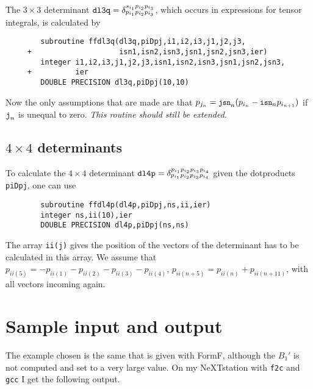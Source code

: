 The $3\times3$ determinant $\mbox{\tt dl3q} = \delta^{s_{i_1} p_{i_2} p_{i_3}
}_{p_{i_1}p_{i_2}p_{i_3}}$, which occurs in expressions for tensor integrals,
is calculated by
\begin{verbatim}
        subroutine ffdl3q(dl3q,piDpj,i1,i2,i3,j1,j2,j3,
     +                    isn1,isn2,isn3,jsn1,jsn2,jsn3,ier)
        integer i1,i2,i3,j1,j2,j3,isn1,isn2,isn3,jsn1,jsn2,jsn3,
     +          ier
        DOUBLE PRECISION dl3q,piDpj(10,10)
\end{verbatim}
Now the only assumptions that are made are that $p_{j_n} = \mbox{\small\tt 
jsn}_n (p_{i_n} - \mbox{\small\tt isn}_n p_{i_{n+1}})$ if $\mbox{\tt j}_n$ is 
unequal to zero.  {\em This routine should still be extended}.

\subsection{$4\times4$ determinants}

To calculate the $4\times4$ determinant $\mbox{\tt dl4p} = 
\delta^{p_{i_1}p_{i_2}p_{i_3}p_{i_4}}_{p_{i_1}p_{i_2}p_{i_3}p_{i_4}}$ given 
the dotproducts {\tt piDpj}, one can use
\begin{verbatim}
        subroutine ffdl4p(dl4p,piDpj,ns,ii,ier)
        integer ns,ii(10),ier
        DOUBLE PRECISION dl4p,piDpj(ns,ns)
\end{verbatim}
The array {\tt ii(j)} gives the position of the vectors of the determinant has 
to be calculated in this array.  We assume that $p_{ii(5)} = -p_{ii(1)} 
-p_{ii(2)} -p_{ii(3)} -p_{ii(4)}$, $p_{ii(n+5)} = p_{ii(n)} + p_{ii(n+11)}$, 
with all vectors incoming again.


\section{Sample input and output}
\label{sc:sample}

The example chosen is the same that is given with FormF\null, although 
the $B_1'$ is not computed and set to a very large value.  On my 
NeXTstation with {\tt f2c} and {\tt gcc} I get the following output.

